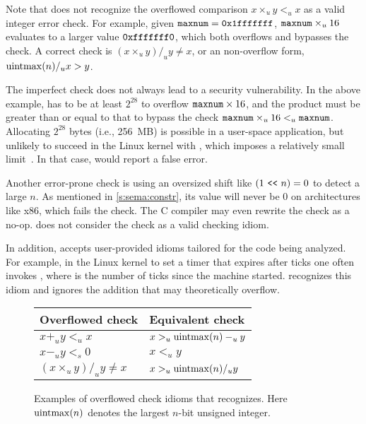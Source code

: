 Note that \sys does not recognize the overflowed comparison $x
\times_u y <_u x$ as a valid integer error check.  For example,
given $\texttt{maxnum} = \texttt{0x1fffffff}$, $\texttt{maxnum} \times_u 16$
evaluates to a larger value $\texttt{0xfffffff0}$, which both overflows
and bypasses the check.  A correct check is $(x \times_u y) /_u y
\neq x$, or an non-overflow form, $\operatorname{uintmax}(n) /_u x > y$.

The imperfect check does not always lead to a security vulnerability.
In the above example,  has to be at least $2^{28}$ to
overflow $\texttt{maxnum} \times 16$, and the product must be greater
than or equal to that to bypass the check $\texttt{maxnum} \times_u 16
<_u \texttt{maxnum}$.  Allocating $2^{28}$ bytes (i.e., 256~MB) is
possible in a user-space application, but unlikely to succeed in
the Linux kernel with , which imposes a relatively small
limit~\cite[\chapterautorefname~8]{ldd3}.  In that case, \sys
would report a false error.

Another error-prone check is using an oversized shift like $(1 \ \texttt{<}\texttt{<}\ 
n) = 0$ to detect a large $n$.  As mentioned in \autoref{s:sema:constr},
its value will never be 0 on architectures like x86, which fails
the check.  The C compiler may even rewrite the check as a no-op.
\sys does not consider the check as a valid checking idiom.

In addition, \sys accepts user-provided idioms tailored for the
code being analyzed.  For example, in the Linux kernel to set a
timer that expires after  ticks one often invokes
, where  is the
number of ticks since the machine started.  \sys recognizes
this idiom and ignores the addition  that may
theoretically overflow.

\begin{figure}
\centering
\begin{tabular}{ll}
\toprule
Overflowed check & Equivalent check \\ \midrule
$x +_u y <_u x$ & $x >_u \operatorname{uintmax}(n) -_u y$ \\
$x -_u y <_s 0$ & $x <_u y$ \\
$(x \times_u y) /_u y \neq x$ & $x >_u \operatorname{uintmax}(n) /_u y$   \\
\bottomrule
\end{tabular}
\caption{Examples of overflowed check idioms that \sys recognizes.
Here $\operatorname{uintmax}(n)$ denotes the largest $n$-bit unsigned integer.}
\label{f:whitelist}
\end{figure}
